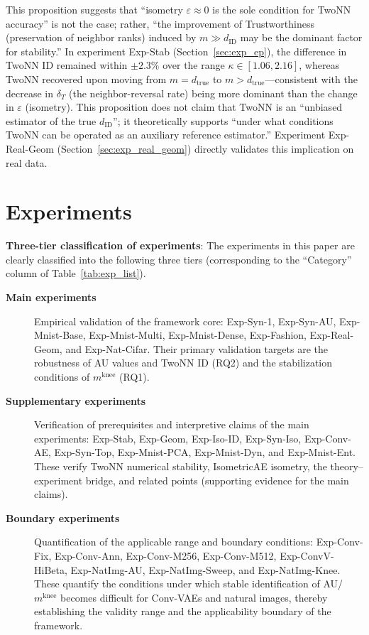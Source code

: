 \documentclass[make,article,submit,pdftex,moreauthors]{Definitions/mdpi}
\newcommand{\kap}{\kappa}
\newcommand{\mknee}{m^{\mathrm{knee}}}
\begin{document}
\begin{Remark}
This proposition suggests that ``isometry $\varepsilon \approx 0$ is the sole condition
for TwoNN accuracy'' is not the case; rather, ``the improvement of Trustworthiness
(preservation of neighbor ranks) induced by $m \gg d_\mathrm{ID}$ may be the dominant
factor for stability.''
In experiment Exp-Stab (Section~\ref{sec:exp_ep}), the difference in TwoNN ID remained
within $\pm 2.3\%$ over the range $\kap \in [1.06, 2.16]$, whereas TwoNN recovered upon
moving from $m = d_\mathrm{true}$ to $m > d_\mathrm{true}$---consistent with the
decrease in $\delta_T$ (the neighbor-reversal rate) being more dominant than the change
in $\varepsilon$ (isometry).
This proposition does not claim that TwoNN is an ``unbiased estimator of the true
$d_\mathrm{ID}$''; it theoretically supports ``under what conditions TwoNN can be operated
as an auxiliary reference estimator.''
Experiment Exp-Real-Geom (Section~\ref{sec:exp_real_geom}) directly validates this
implication on real data.
\end{Remark}

\section{Experiments}\label{sec:exp}

\textbf{Three-tier classification of experiments}:
The experiments in this paper are clearly classified into the following three tiers
(corresponding to the ``Category'' column of Table~\ref{tab:exp_list}).
\begin{description}
  \item[\textbf{Main experiments}]
        Empirical validation of the framework core:
        Exp-Syn-1, Exp-Syn-AU, Exp-Mnist-Base, Exp-Mnist-Multi, Exp-Mnist-Dense, Exp-Fashion, Exp-Real-Geom, and Exp-Nat-Cifar.
        Their primary validation targets are the robustness of AU values and TwoNN ID (RQ2) and the stabilization conditions of $\mknee$ (RQ1).
  \item[\textbf{Supplementary experiments}]
        Verification of prerequisites and interpretive claims of the main experiments:
        Exp-Stab, Exp-Geom, Exp-Iso-ID, Exp-Syn-Iso, Exp-Conv-AE, Exp-Syn-Top, Exp-Mnist-PCA, Exp-Mnist-Dyn, and Exp-Mnist-Ent.
        These verify TwoNN numerical stability, IsometricAE isometry, the theory--experiment bridge, and related points (supporting evidence for the main claims).
  \item[\textbf{Boundary experiments}]
        Quantification of the applicable range and boundary conditions:
        Exp-Conv-Fix, Exp-Conv-Ann, Exp-Conv-M256, Exp-Conv-M512, Exp-ConvV-HiBeta, Exp-NatImg-AU, Exp-NatImg-Sweep, and Exp-NatImg-Knee.
        These quantify the conditions under which stable identification of AU/$\mknee$ becomes difficult for Conv-VAEs and natural images,
        thereby establishing the validity range and the applicability boundary of the framework.
\end{description}
\end{document}
